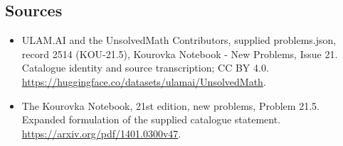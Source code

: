 \documentclass[11pt,a4paper]{article}
\begin{document}
\subsection{Sources}
\begin{itemize}
\item[S1] ULAM.AI and the UnsolvedMath Contributors, supplied problems.json, record 2514 (KOU-21.5), Kourovka Notebook - New Problems, Issue 21. Catalogue identity and source transcription; CC BY 4.0.
\url{https://huggingface.co/datasets/ulamai/UnsolvedMath}.
\item[S2] The Kourovka Notebook, 21st edition, new problems, Problem 21.5. Expanded formulation of the supplied catalogue statement.
\url{https://arxiv.org/pdf/1401.0300v47}.
\end{itemize}
\end{document}
